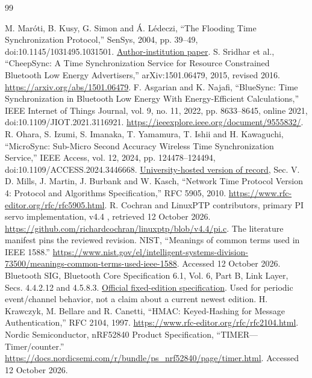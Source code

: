 \documentclass[11pt,letterpaper]{article}
\begin{document}
\begin{thebibliography}{99}\small\raggedright
{} M. Mar\'oti, B. Kusy, G. Simon and \'A. L\'edeczi, ``The Flooding Time Synchronization Protocol,'' SenSys, 2004, pp. 39--49, doi:10.1145/1031495.1031501. \href{https://archive.isis.vanderbilt.edu/sites/default/files/Maroti_M_11_3_2004_The_Floodi.pdf}{Author-institution paper}.
 S. Sridhar et al., ``CheepSync: A Time Synchronization Service for Resource Constrained Bluetooth Low Energy Advertisers,'' arXiv:1501.06479, 2015, revised 2016. \url{https://arxiv.org/abs/1501.06479}.
 F. Asgarian and K. Najafi, ``BlueSync: Time Synchronization in Bluetooth Low Energy With Energy-Efficient Calculations,'' IEEE Internet of Things Journal, vol. 9, no. 11, 2022, pp. 8633--8645, online 2021, doi:10.1109/JIOT.2021.3116921. \url{https://ieeexplore.ieee.org/document/9555832/}.
 R. Ohara, S. Izumi, S. Imanaka, T. Yamamura, T. Ishii and H. Kawaguchi, ``MicroSync: Sub-Micro Second Accuracy Wireless Time Synchronization Service,'' IEEE Access, vol. 12, 2024, pp. 124478--124494, doi:10.1109/ACCESS.2024.3446668. \href{https://da.lib.kobe-u.ac.jp/da/kernel/0100491658/0100491658.pdf}{University-hosted version of record}, Sec. V.
 D. Mills, J. Martin, J. Burbank and W. Kasch, ``Network Time Protocol Version 4: Protocol and Algorithms Specification,'' RFC 5905, 2010. \url{https://www.rfc-editor.org/rfc/rfc5905.html}.
 R. Cochran and LinuxPTP contributors, primary PI servo implementation, v4.4 , retrieved 12 October 2026. \url{https://github.com/richardcochran/linuxptp/blob/v4.4/pi.c}. The literature manifest pins the reviewed revision.
 NIST, ``Meanings of common terms used in IEEE 1588.'' \url{https://www.nist.gov/el/intelligent-systems-division-73500/meanings-common-terms-used-ieee-1588}. Accessed 12 October 2026.
 Bluetooth SIG, Bluetooth Core Specification 6.1, Vol. 6, Part B, Link Layer, Secs. 4.4.2.12 and 4.5.8.3. \href{https://www.bluetooth.com/wp-content/uploads/Files/Specification/HTML/Core-61/out/en/low-energy-controller/link-layer-specification.html}{Official fixed-edition specification}. Used for periodic event/channel behavior, not a claim about a current newest edition.
 H. Krawczyk, M. Bellare and R. Canetti, ``HMAC: Keyed-Hashing for Message Authentication,'' RFC 2104, 1997. \url{https://www.rfc-editor.org/rfc/rfc2104.html}.
 Nordic Semiconductor, nRF52840 Product Specification, ``TIMER---Timer/counter.'' \url{https://docs.nordicsemi.com/r/bundle/ps_nrf52840/page/timer.html}. Accessed 12 October 2026.

\end{thebibliography}
\end{document}
